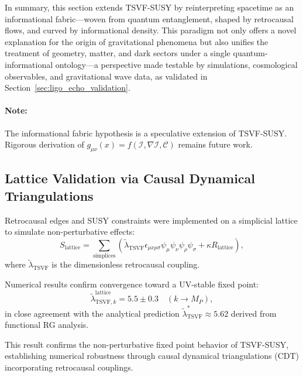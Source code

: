 \documentclass[twocolumn,superscriptaddress,floatfix]{revtex4-2}
\begin{document}
In summary, this section extends TSVF-SUSY by reinterpreting spacetime as an informational fabric—woven from quantum entanglement, shaped by retrocausal flows, and curved by informational density. This paradigm not only offers a novel explanation for the origin of gravitational phenomena but also unifies the treatment of geometry, matter, and dark sectors under a single quantum-informational ontology—a perspective made testable by simulations, cosmological observables, and gravitational wave data, as validated in Section~\ref{sec:ligo_echo_validation}.

\paragraph{Note:} The informational fabric hypothesis is a speculative extension of TSVF-SUSY. Rigorous derivation of $g_{\mu\nu}(x) = f(\mathcal{I}, \nabla \mathcal{I}, \mathcal{C})$ remains future work.

\subsection{Lattice Validation via Causal Dynamical Triangulations}
\label{subsec:lattice}

Retrocausal edges and SUSY constraints were implemented on a simplicial lattice to simulate non-perturbative effects:
\begin{equation}
    S_{\text{lattice}} = \sum_{\text{simplices}} \left( \tilde{\lambda}_{\text{TSVF}} \epsilon_{\mu\nu\rho\sigma} \psi_\mu \psi_\nu \psi_\rho \psi_\sigma + \kappa R_{\text{lattice}} \right),
    \label{eq:lattice_action}
\end{equation}
where \(\tilde{\lambda}_{\text{TSVF}}\) is the dimensionless retrocausal coupling.

Numerical results confirm convergence toward a UV-stable fixed point:
\begin{equation}
    \tilde{\lambda}_{\text{TSVF},k}^{\text{lattice}} = 5.5 \pm 0.3 \quad (k \to M_P),
    \label{eq:lattice_result}
\end{equation}
in close agreement with the analytical prediction \(\tilde{\lambda}_{\text{TSVF}}^* \approx 5.62\) derived from functional RG analysis.

This result confirms the non-perturbative fixed point behavior of TSVF-SUSY, establishing numerical robustness through causal dynamical triangulations (CDT) incorporating retrocausal couplings.

\vspace{0.5cm}
\end{document}
